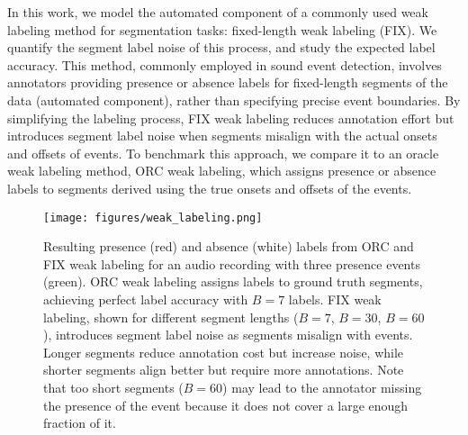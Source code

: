In this work, we model the automated component of a commonly used weak labeling method for segmentation tasks: fixed-length weak labeling (FIX). We quantify the segment label noise of this process, and study the expected label accuracy. This method, commonly employed in sound event detection, involves annotators providing presence or absence labels for fixed-length segments of the data (automated component), rather than specifying precise event boundaries. By simplifying the labeling process, FIX weak labeling reduces annotation effort but introduces segment label noise when segments misalign with the actual onsets and offsets of events. To benchmark this approach, we compare it to an oracle weak labeling method, ORC weak labeling, which assigns presence or absence labels to segments derived using the true onsets and offsets of the events.


\begin{figure}
    \centering
    \texttt{[image: figures/weak\_labeling.png]}
    \caption{Resulting presence (red) and absence (white) labels from ORC and FIX weak labeling for an audio recording with three presence events (green). ORC weak labeling assigns labels to ground truth segments, achieving perfect label accuracy with $B=7$ labels. FIX weak labeling, shown for different segment lengths ($B=7$, $B=30$, $B=60$), introduces segment label noise as segments misalign with events. Longer segments reduce annotation cost but increase noise, while shorter segments align better but require more annotations. Note that too short segments ($B=60$) may lead to the annotator missing the presence of the event because it does not cover a large enough fraction of it.}
    \label{fig:weak_labeling}
\end{figure}

